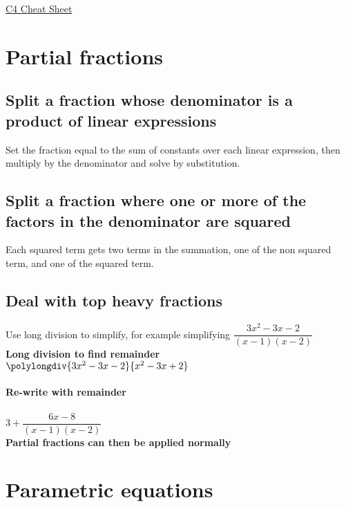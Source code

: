 \documentclass{article}[18pt]
\begin{document}
\begin{center}
\underline{\huge C4 Cheat Sheet}
\end{center}
\section{Partial fractions}
\subsection{Split a fraction whose denominator is a product of linear expressions}
Set the fraction equal to the sum of constants over each linear expression, then multiply by the denominator and solve by substitution.
\subsection{Split a fraction where one or more of the factors in the denominator are squared}
Each squared term gets two terms in the summation, one of the non squared term, and one of the squared term.
\subsection{Deal with top heavy fractions}
Use long division to simplify, for example simplifying $\dfrac{3x^2-3x-2}{(x-1)(x-2)}$\\
\textbf{Long division to find remainder}\\
$\polylongdiv{3x^2-3x-2}{x^2-3x+2}$\\
\\
\textbf{Re-write with remainder}\\
\\
$3+\dfrac{6x-8}{(x-1)(x-2)}$\\
\textbf{Partial fractions can then be applied normally}
\section{Parametric equations}
\end{document}
